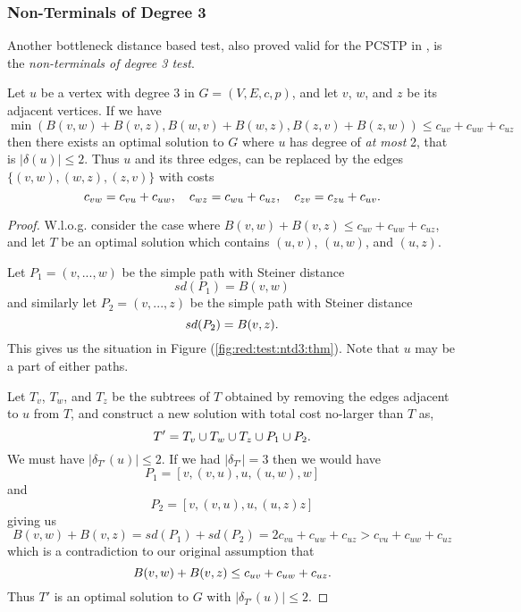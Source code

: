 \subsubsection{Non-Terminals of Degree 3}
\label{sec:red:test:deg3}
Another bottleneck distance based test,
also proved valid for the PCSTP in \cite{uchoa2006reduction},
is the \textit{non-terminals of degree 3 test}.
\begin{theorem}\label{thm:ntd3}
  Let $u$ be a vertex with degree 3 in $G = (V, E, c, p)$,
  and let $v$, $w$, and $z$ be its adjacent
  vertices. If we have
  $$\min\left(B(v,w) + B(v,z), B(w,v) + B(w,z),  B(z, v)+ B(z, w)\right) \leq
  c_{uv} + c_{uw} + c_{uz}$$
  then there exists an optimal solution to $G$ where $u$ has degree of
  \textit{at most} 2, that is $|\delta(u)| \leq 2$. Thus $u$ and its three edges, can be replaced by
  the edges $\{(v, w), (w,z), (z,v)\}$ with costs
  $$c_{vw} = c_{vu} + c_{uw},\quad c_{wz} = c_{wu} + c_{uz},\quad c_{zv} = c_{zu} + c_{uv}\mathnormal{.}$$
\end{theorem}
\begin{proof}   
  W.l.o.g. consider the case where $B(v,w) + B(v,z) \leq c_{uv} + c_{uw} + c_{uz}$,
  and let $T$ be an optimal solution which contains $(u,v)$, $(u,w)$, and $(u,z)$.

  Let $P_1 = (v, ..., w)$ be the simple path with Steiner distance
  $$sd(P_1) = B(v,w)$$
  and similarly let $P_2 = (v, ..., z)$ be the simple path with Steiner distance
  $$sd(P_2) = B(v,z)\mathnormal{.}$$
  This gives us the situation in Figure (\ref{fig:red:test:ntd3:thm}). Note that $u$ may be a part of either paths.

  Let $T_v$, $T_w$, and $T_z$ be the subtrees of $T$ obtained by
  removing the edges adjacent to $u$ from $T$, and construct a new solution with
   total cost no-larger than $T$ as,
   $$T' = T_v \cup T_w \cup T_z \cup P_1 \cup P_2\mathnormal{.}$$
   We must have $|\delta_{T'}(u)| \leq 2$. If we had $|\delta_{T'}| = 3$ then
   we would have
   $$P_1 = \left[v, (v,u), u, (u,w), w \right]$$
   and
   $$P_2 = \left[v, (v,u), u, (u,z) z \right]$$
   giving us
   $$B(v,w) + B(v, z) = sd(P_1) + sd(P_2) = 2 c_{vu} + c_{uw} + c_{uz} > c_{vu} + c_{uw} + c_{uz}$$
   which is a contradiction to our original assumption that
   $$B(v,w) + B(v,z) \leq c_{uv} + c_{uw} + c_{uz}\mathnormal{.}$$
   Thus $T'$ is an optimal solution to $G$ with $|\delta_{T'}(u)| \leq 2$.
\end{proof}
